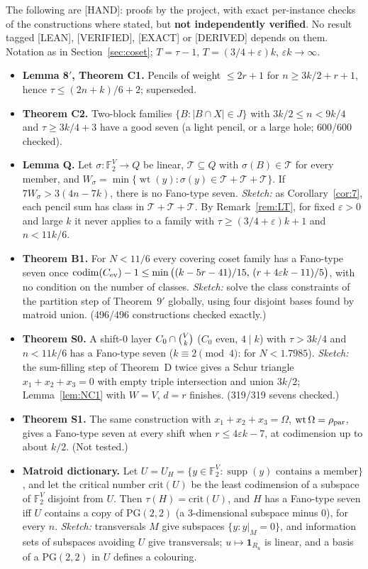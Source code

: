 \documentclass[11pt]{article}
\theoremstyle{definition}
\newcommand{\st}[1]{\textsf{\small[#1]}}
\newcommand{\F}{\mathbb{F}_2}
\newcommand{\wt}{\operatorname{wt}}
\newcommand{\codim}{\operatorname{codim}}
\newcommand{\binomV}[1]{\tbinom{V}{#1}}
\begin{document}
The following are \st{HAND}: proofs by the project, with exact per-instance checks of the constructions where stated,
but \textbf{not independently verified}. No result tagged \st{LEAN}, \st{VERIFIED}, \st{EXACT} or \st{DERIVED} depends on them. Notation as in
Section~\ref{sec:coset}; $T=\tau-1$, $T=(3/4+\varepsilon)k$, $\varepsilon k\to\infty$.
\begin{itemize}[leftmargin=*]
\item \textbf{Lemma 8$'$, Theorem C1.} Pencils of weight $\le2r+1$ for $n\ge3k/2+r+1$, hence $\tau\le(2n+k)/6+2$;
superseded.
\item \textbf{Theorem C2.} Two-block families $\{B:|B\cap X|\in J\}$ with $3k/2\le n<9k/4$ and $\tau\ge3k/4+3$ have a
good seven (a light pencil, or a large hole; 600/600 checked).
\item \textbf{Lemma Q.} Let $\sigma:\F^V\to Q$ be linear, $\mathcal T\subseteq Q$ with $\sigma(B)\in\mathcal T$ for every
member, and $W_\sigma=\min\{\wt(y):\sigma(y)\in\mathcal T+\mathcal T+\mathcal T\}$. If $7W_\sigma>3(4n-7k)$, there is
no Fano-type seven. \emph{Sketch:} as Corollary~\ref{cor:7}, each pencil sum has class in $\mathcal T+\mathcal T+\mathcal T$. By Remark~\ref{rem:LT}, for fixed $\varepsilon>0$ and large $k$ it never applies to a family with
$\tau\ge(3/4+\varepsilon)k+1$ and $n<11k/6$.
\item \textbf{Theorem B1.} For $N<11/6$ every covering coset family has a Fano-type seven once
$\codim(C_{\rm ev})-1\le\min\big((k-5r-41)/15,\,(r+4\varepsilon k-11)/5\big)$, with no condition on the number of classes.
\emph{Sketch:} solve the class constraints of the partition step of Theorem~$9'$ globally, using four disjoint bases
found by matroid union. (496/496 constructions checked exactly.)
\item \textbf{Theorem S0.} A shift-$0$ layer $C_0\cap\binomV k$ ($C_0$ even, $4\mid k$) with $\tau>3k/4$ and $n<11k/6$
has a Fano-type seven ($k\equiv2\pmod 4$: for $N<1.7985$). \emph{Sketch:} the sum-filling step of Theorem~D twice gives
a Schur triangle $x_1+x_2+x_3=0$ with empty triple intersection and union $3k/2$; Lemma~\ref{lem:NC1} with $W=V$,
$d=r$ finishes. (319/319 sevens checked.)
\item \textbf{Theorem S1.} The same construction with $x_1+x_2+x_3=\Omega$, $\wt\Omega=\rho_{\rm par}$, gives a
Fano-type seven at every shift when $r\le4\varepsilon k-7$, at codimension up to about $k/2$. (Not tested.)
\item \textbf{Matroid dictionary.} Let $U=U_H=\{y\in\F^V:\operatorname{supp}(y)\text{ contains a member}\}$, and let the
critical number $\mathrm{crit}(U)$ be the least codimension of a subspace of $\F^V$ disjoint from $U$. Then
$\tau(H)=\mathrm{crit}(U)$, and $H$ has a Fano-type seven iff $U$ contains a copy of $\mathrm{PG}(2,2)$ (a
$3$-dimensional subspace minus $0$), for every $n$. \emph{Sketch:} transversals $M$ give subspaces $\{y:y|_M=0\}$, and
information sets of subspaces avoiding $U$ give transversals; $u\mapsto\mathbf 1_{R_u}$ is linear, and a basis of a
$\mathrm{PG}(2,2)$ in $U$ defines a colouring.
\end{itemize}
\end{document}
